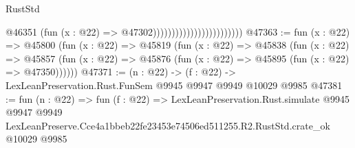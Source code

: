 \begin{lexlean}{RustStd}
\begin{coremodule}
                                                @46351
                                                  (fun (x : @22) => @47302))))))))))))))))))))))))
@47363 := fun (x : @22) =>
  @45800
    (fun (x : @22) =>
    @45819
      (fun (x : @22) =>
      @45838
        (fun (x : @22) =>
        @45857 (fun (x : @22) => @45876 (fun (x : @22) => @45895 (fun (x : @22) => @47350))))))
@47371 := (n : @22) -> (f : @22) -> LexLeanPreservation.Rust.FunSem @9945 @9947 @9949 @10029 @9985
@47381 := fun (n : @22) =>
  fun (f : @22) =>
  LexLeanPreservation.Rust.simulate
    @9945
    @9947
    @9949
    LexLeanPreserve.Cce4a1bbeb22fe23453e74506ed511255.R2.RustStd.crate_ok
    @10029
    @9985
\end{coremodule}
\end{lexlean}
